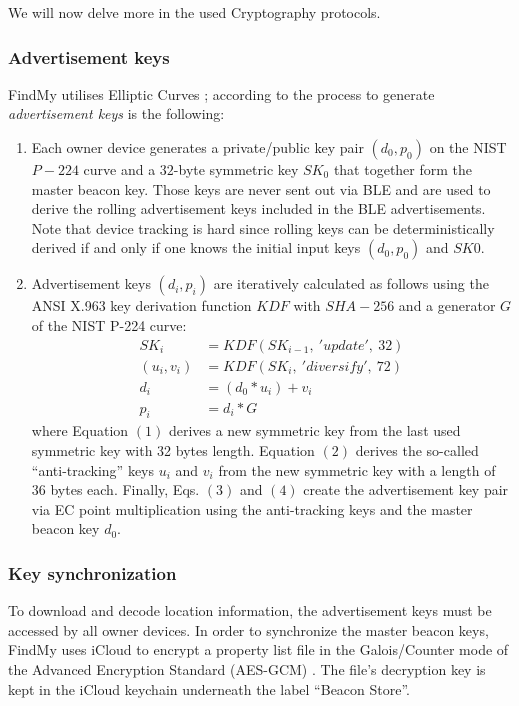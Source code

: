 \documentclass[english]{article}
\begin{document}
We will now delve more in the used Cryptography protocols. 

\subsubsection{Advertisement keys}
FindMy utilises Elliptic Curves \cite{ec}; according to \cite{aps,whocanfind} the process to generate \textit{advertisement keys} is the following:
\begin{enumerate}
  \item Each owner device generates a private/public key pair
  $(d_0, p_0)$ on the NIST $P-224$ curve and a $32$-byte symmetric key $SK_0$ that together form the master beacon key. Those keys are never sent out via BLE and are used to derive the rolling advertisement keys included in the BLE advertisements. Note that device tracking is hard since rolling keys can be deterministically derived if and only if one knows the initial input keys $(d_0, p_0)$ and $SK0$.
  \item Advertisement keys $(d_i,p_i)$ are iteratively calculated as follows using the ANSI X.963 key derivation function $KDF$ \cite{ANSI} with $SHA-256$ \cite{sha} and a generator $G$ of the NIST P-224 curve:
  \begin{align}
    SK_i &= KDF(SK_{i-1},\ 'update',\ 32) \\
    (u_i, v_i) &= KDF(SK_i,\ 'diversify',\ 72) \\
    d_i &= (d_0 * u_i) + v_i \\
    p_i &= d_i * G
  \end{align}
  where Equation $(1)$ derives a new symmetric key from the last used symmetric key with 32 bytes length. Equation $(2)$ derives the so-called “anti-tracking” keys $u_i$ and $v_i$ from the new symmetric key with a length of $36$ bytes each. Finally, Eqs. $(3)$ and $(4)$ create the advertisement key pair via EC point multiplication using the anti-tracking keys and the master beacon key $d_0$.
\end{enumerate}

\subsubsection{Key synchronization}
To download and decode location information, the advertisement keys must be accessed by all owner devices. In order to synchronize the master beacon keys, FindMy uses iCloud to encrypt a property list file in the Galois/Counter mode of the Advanced Encryption Standard (AES-GCM) \cite{gcm}. The file's decryption key is kept in the iCloud keychain underneath the label “Beacon Store”.
\end{document}
